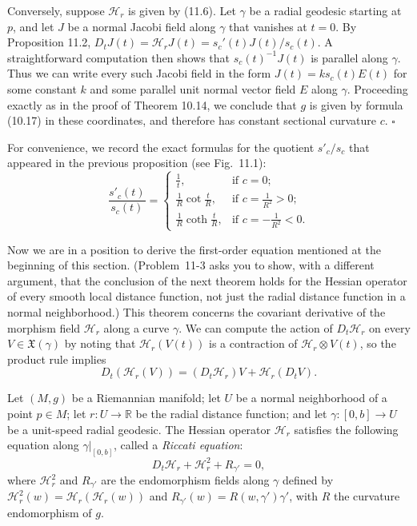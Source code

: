 Conversely, suppose $\mathcal{H}_r$ is given by (11.6). Let $\gamma$ be a radial geodesic starting at $p$, and let $J$ be a normal Jacobi field along $\gamma$ that vanishes at $t = 0$. By Proposition 11.2, $D_t J(t) = \mathcal{H}_r J(t) = s_c'(t) J(t)/s_c(t)$. A straightforward computation then shows that $s_c(t)^{-1}J(t)$ is parallel along $\gamma$. Thus we can write every such Jacobi field in the form $J(t) = k s_c(t) E(t)$ for some constant $k$ and some parallel unit normal vector field $E$ along $\gamma$. Proceeding exactly as in the proof of Theorem 10.14, we conclude that $g$ is given by formula (10.17) in these coordinates, and therefore has constant sectional curvature $c$. $\square$


For convenience, we record the exact formulas for the quotient $s'_c/s_c$ that appeared in the previous proposition (see Fig.~11.1):
\[
\frac{s'_c(t)}{s_c(t)} = \begin{cases}
\frac{1}{t}, & \text{if } c = 0; \\
\frac{1}{R} \cot \frac{t}{R}, & \text{if } c = \frac{1}{R^2} > 0; \\
\frac{1}{R} \coth \frac{t}{R}, & \text{if } c = -\frac{1}{R^2} < 0.
\end{cases}
\]

Now we are in a position to derive the first-order equation mentioned at the beginning of this section. (Problem~11-3 asks you to show, with a different argument, that the conclusion of the next theorem holds for the Hessian operator of every smooth local distance function, not just the radial distance function in a normal neighborhood.) This theorem concerns the covariant derivative of the morphism field $\mathcal{H}_r$ along a curve $\gamma$. We can compute the action of $D_t\mathcal{H}_r$ on every $V \in \mathfrak{X}(\gamma)$ by noting that $\mathcal{H}_r(V(t))$ is a contraction of $\mathcal{H}_r \otimes V(t)$, so the product rule implies
\[
D_t(\mathcal{H}_r(V)) = (D_t \mathcal{H}_r)V + \mathcal{H}_r(D_t V).
\]

\begin{theorem}
\label{thm:riccati-equation}
Let $(M, g)$ be a Riemannian manifold; let $U$ be a normal neighborhood of a point $p \in M$; let $r : U \to \mathbb{R}$ be the radial distance function; and let $\gamma : [0, b] \to U$ be a unit-speed radial geodesic. The Hessian operator $\mathcal{H}_r$ satisfies the following equation along $\gamma|_{[0,b]}$, called a \emph{Riccati equation}:
\begin{equation}
D_t \mathcal{H}_r + \mathcal{H}_r^2 + R_{\gamma'} = 0, \tag{11.7}
\end{equation}
where $\mathcal{H}_r^2$ and $R_{\gamma'}$ are the endomorphism fields along $\gamma$ defined by $\mathcal{H}_r^2(w) = \mathcal{H}_r(\mathcal{H}_r(w))$ and $R_{\gamma'}(w) = R(w,\gamma')\gamma'$, with $R$ the curvature endomorphism of $g$.
\end{theorem}

